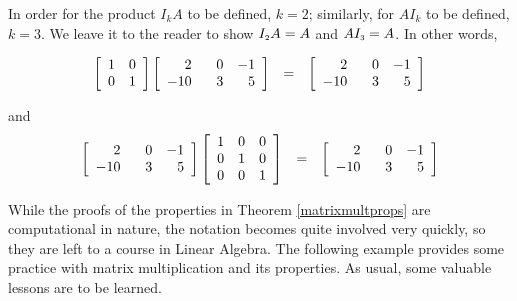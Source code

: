 \documentclass{ximera}
\begin{document}
In order for the product $I_{k}A$ to be defined, $k = 2$;  similarly, for $AI_{k}$ to be defined, $k = 3$.  We leave it to the reader to show $I_{\mbox{\tiny$2$}}A = A$ and $AI_{\mbox{\tiny$3$}} = A$.  In other words,


\[\begin{array}{rcl}
\left[ \begin{array}{rr} 1 & 0 \\ 0 & 1 \\ \end{array} \right] \left[\begin{array}{rrr} 2 & \hphantom{-}0 & -1 \\ -10 & 3 & 5 \\ \end{array} \right] & = & \left[\begin{array}{rrr} 2 & \hphantom{-}0 & -1 \\ -10 & 3 & 5 \\ \end{array} \right] \\ \end{array}\]

and
\[\begin{array}{rcl}
\left[\begin{array}{rrr} 2 & \hphantom{-}0 & -1 \\ -10 & 3 & 5 \\ \end{array} \right]\left[ \begin{array}{rrr} 1 & 0 & 0 \\ 0 & 1 & 0 \\ 0 & 0 & 1 \\ \end{array} \right] & = & \left[\begin{array}{rrr} 2 & \hphantom{-}0 & -1 \\ -10 & 3 & 5 \\ \end{array} \right] \\ \end{array}\]

While the proofs of the properties in Theorem \ref{matrixmultprops} are computational in nature, the notation becomes quite involved very quickly, so they are left to a course in Linear Algebra. The following example provides some practice with matrix multiplication and its properties.  As usual, some valuable lessons are to be learned.
\end{document}
